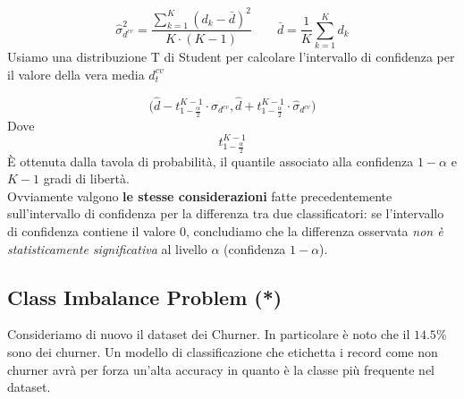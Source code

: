 \[ \hat{\sigma}^2_{d^{cv}} = \frac{\sum_{k=1}^{K}(d_k - \bar{d})^2}{K \cdot (K-1)} \qquad \bar{d} = \frac{1}{K} \sum_{k=1}^K d_k \]
Usiamo una distribuzione T di Student per calcolare l'intervallo di confidenza per il valore della vera media $d_t^{cv}$

\[\biggl( \hat{d} - t_{1-\frac{\alpha}{2}}^{K-1} \cdot \hat{\sigma}_{d^{cv}}
,
\hat{d} + t_{1-\frac{\alpha}{2}}^{K-1} \cdot \hat{\sigma}_{d^{cv}} \biggr)\]
Dove 
\[t_{1-\frac{\alpha}{2}}^{K-1}\]
\`E ottenuta dalla tavola di probabilità, il quantile associato alla confidenza $1-\alpha$ e $K-1$ gradi di libertà.\\
Ovviamente valgono \textbf{le stesse considerazioni} fatte precedentemente sull'intervallo di confidenza per la differenza tra due classificatori: se l'intervallo di confidenza contiene il valore 0, concludiamo che la differenza osservata \textit{non è statisticamente significativa} al livello $\alpha$ (confidenza $1-\alpha$). 

\subsection{Class Imbalance Problem (*)}
Consideriamo di nuovo il dataset dei Churner. In particolare è noto che il $14.5\%$ sono dei churner. Un modello di classificazione che etichetta i record come non churner avrà per forza un'alta accuracy in quanto è la classe più frequente nel dataset. 

